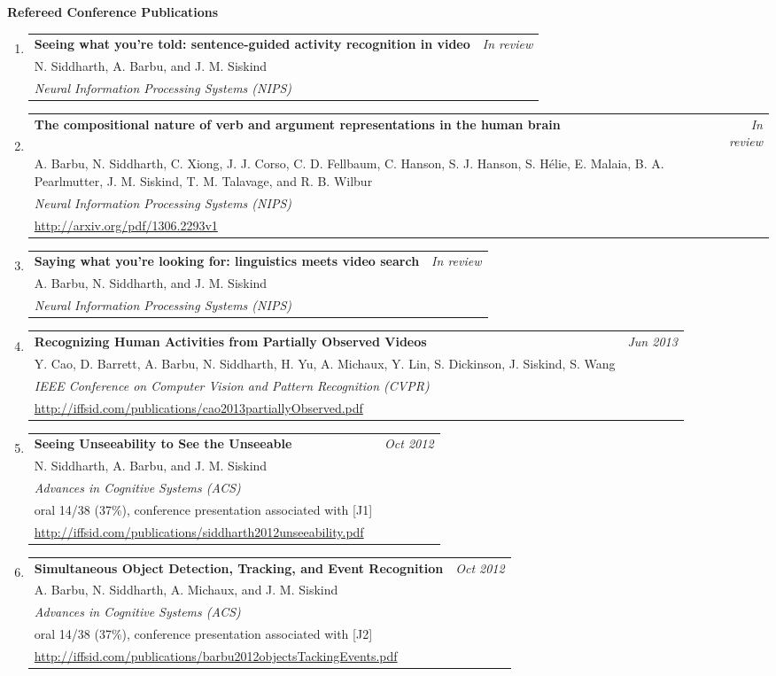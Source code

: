 \documentclass[10pt]{article}
\makeatletter
\newenvironment{publication}[5]
{ \item
  \begin{tabular*}{6.5in}{p{5.3in}@{\extracolsep{\fill}}r}
    \textbf{#1} & \textit{#2}\\ #3 &\\ \textit{#4}\\ #5
  \end{tabular*}
} {}
\newenvironment{region}[2]{%
  \vspace*{0.5ex}
  {\large \textbf{#1}}
  \begin{enumerate}[\color{RoyalBlue}#2]}
  {\end{enumerate}}
\makeatother
\begin{document}
\begin{region} {Refereed Conference Publications}{{C}1}
  \begin{publication} {Seeing what you're told: sentence-guided activity recognition in video}
    {In review}
    {N. Siddharth, A. Barbu, and J. M. Siskind}
    {Neural Information Processing Systems (NIPS)}
    {}
  \end{publication}
  \begin{publication} {The compositional nature of verb and argument representations in the human brain}
    {In review}
    {A. Barbu, N. Siddharth, C. Xiong, J. J. Corso, C. D. Fellbaum, C. Hanson, S. J. Hanson, S.
      H\'elie, E. Malaia, B. A. Pearlmutter, J. M. Siskind, T. M. Talavage, and R. B. Wilbur}
    {Neural Information Processing Systems (NIPS)}
    {\url{http://arxiv.org/pdf/1306.2293v1}}
  \end{publication}
  \begin{publication} {Saying what you're looking for: linguistics meets video search}
    {In review}
    {A. Barbu, N. Siddharth, and J. M. Siskind}
    {Neural Information Processing Systems (NIPS)}
    {}
  \end{publication}
  \begin{publication} {Recognizing Human Activities from Partially Observed Videos}
    {Jun 2013}
    {Y. Cao, D. Barrett, A. Barbu, N. Siddharth, H. Yu, A. Michaux, Y. Lin,
      S. Dickinson, J. Siskind, S. Wang}
    {IEEE Conference on Computer Vision and Pattern Recognition (CVPR)}
    {\url{http://iffsid.com/publications/cao2013partiallyObserved.pdf}}
  \end{publication}
  \begin{publication} {Seeing Unseeability to See the Unseeable}
    {Oct 2012}
    {N. Siddharth, A. Barbu, and J. M. Siskind}
    {Advances in Cognitive Systems (ACS)}
    {oral 14/38 (37\%), conference presentation associated with [{\color{RoyalBlue}J1}]\\
    \url{http://iffsid.com/publications/siddharth2012unseeability.pdf}}
  \end{publication}
  \begin{publication} {Simultaneous Object Detection, Tracking, and Event Recognition}
    {Oct 2012}
    {A. Barbu, N. Siddharth, A. Michaux, and J. M. Siskind}
    {Advances in Cognitive Systems (ACS)}
    {oral 14/38 (37\%), conference presentation associated with [{\color{RoyalBlue}J2}]\\
    \url{http://iffsid.com/publications/barbu2012objectsTackingEvents.pdf}}

\end{publication}
\end{region}
\end{document}

